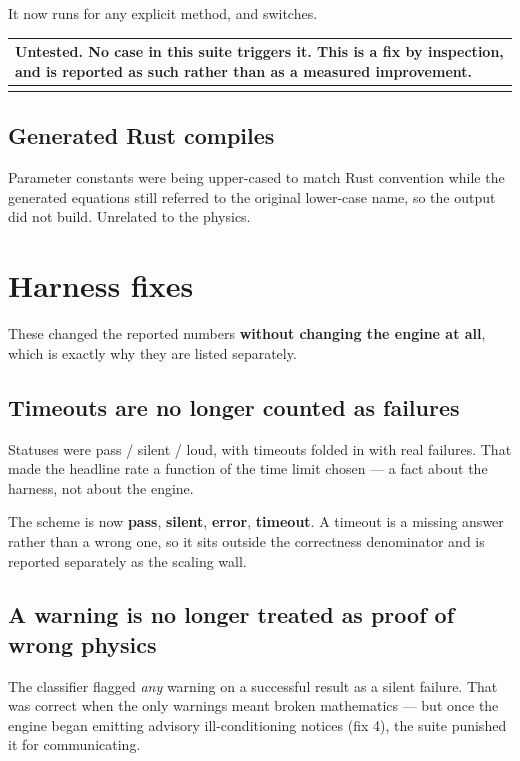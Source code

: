 \documentclass[11pt,a4paper]{article}
\makeatletter
\newenvironment{callout}
  {\par\medskip\noindent\begin{tabular}{@{}p{0.94\textwidth}@{}}
   \arrayrulecolor{warnrule}\hline\rule{0pt}{2.6ex}}
  {\\[0.8ex]\hline\arrayrulecolor{black}\end{tabular}\par\medskip}
\makeatother
\begin{document}
It now runs for any explicit method, and switches.

\begin{callout}
\textbf{Untested.} No case in this suite triggers it. This is a fix by
inspection, and is reported as such rather than as a measured improvement.
\end{callout}

\subsection{Generated Rust compiles}

Parameter constants were being upper-cased to match Rust convention while the
generated equations still referred to the original lower-case name, so the
output did not build. Unrelated to the physics.

\section{Harness fixes}\label{sec:harness}

\noindent These changed the reported numbers \textbf{without changing the
engine at all}, which is exactly why they are listed separately.

\subsection{Timeouts are no longer counted as failures}

Statuses were pass / silent / loud, with timeouts folded in with real failures.
That made the headline rate a function of the time limit chosen --- a fact
about the harness, not about the engine.

The scheme is now \textbf{pass}, \textbf{silent}, \textbf{error},
\textbf{timeout}. A timeout is a missing answer rather than a wrong one, so it
sits outside the correctness denominator and is reported separately as the
scaling wall.

\subsection{A warning is no longer treated as proof of wrong physics}

The classifier flagged \emph{any} warning on a successful result as a silent
failure. That was correct when the only warnings meant broken mathematics ---
but once the engine began emitting advisory ill-conditioning notices (fix 4),
the suite punished it for communicating.
\end{document}
